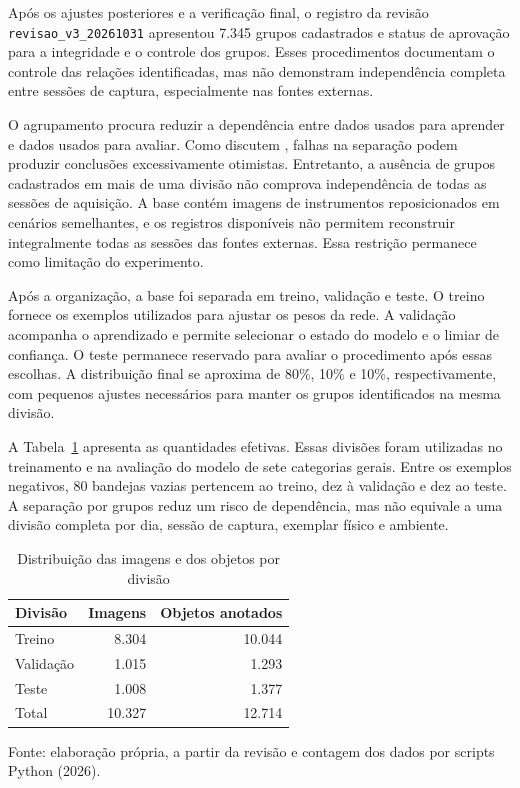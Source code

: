 Após os ajustes posteriores e a verificação final, o registro da revisão \texttt{revisao\_v3\_20261031} apresentou 7.345 grupos cadastrados e status de aprovação para a integridade e o controle dos grupos. Esses procedimentos documentam o controle das relações identificadas, mas não demonstram independência completa entre sessões de captura, especialmente nas fontes externas.


O agrupamento procura reduzir a dependência entre dados usados para aprender e dados usados para avaliar. Como discutem \textcite{kapoor2023}, falhas na separação podem produzir conclusões excessivamente otimistas. Entretanto, a ausência de grupos cadastrados em mais de uma divisão não comprova independência de todas as sessões de aquisição. A base contém imagens de instrumentos reposicionados em cenários semelhantes, e os registros disponíveis não permitem reconstruir integralmente todas as sessões das fontes externas. Essa restrição permanece como limitação do experimento.

Após a organização, a base foi separada em treino, validação e teste. O treino fornece os exemplos utilizados para ajustar os pesos da rede. A validação acompanha o aprendizado e permite selecionar o estado do modelo e o limiar de confiança. O teste permanece reservado para avaliar o procedimento após essas escolhas. A distribuição final se aproxima de 80\%, 10\% e 10\%, respectivamente, com pequenos ajustes necessários para manter os grupos identificados na mesma divisão.

A Tabela~\ref{tab:met-splits} apresenta as quantidades efetivas. Essas divisões foram utilizadas no treinamento e na avaliação do modelo de sete categorias gerais. Entre os exemplos negativos, 80 bandejas vazias pertencem ao treino, dez à validação e dez ao teste. A separação por grupos reduz um risco de dependência, mas não equivale a uma divisão completa por dia, sessão de captura, exemplar físico e ambiente.

\begin{table}[htbp]
\centering
\begin{minipage}{0.92\linewidth}
\singlespacing\small
\caption{Distribuição das imagens e dos objetos por divisão}
\label{tab:met-splits}
\centering
\begin{tabular}{lrr}
\hline
Divisão & Imagens & Objetos anotados \\
\hline
Treino & 8.304 & 10.044 \\
Validação & 1.015 & 1.293 \\
Teste & 1.008 & 1.377 \\
\hline
Total & 10.327 & 12.714 \\
\hline
\end{tabular}\par
\vspace{0.35em}\raggedright
Fonte: elaboração própria, a partir da revisão e contagem dos dados por scripts Python (2026).
\end{minipage}
\end{table}

